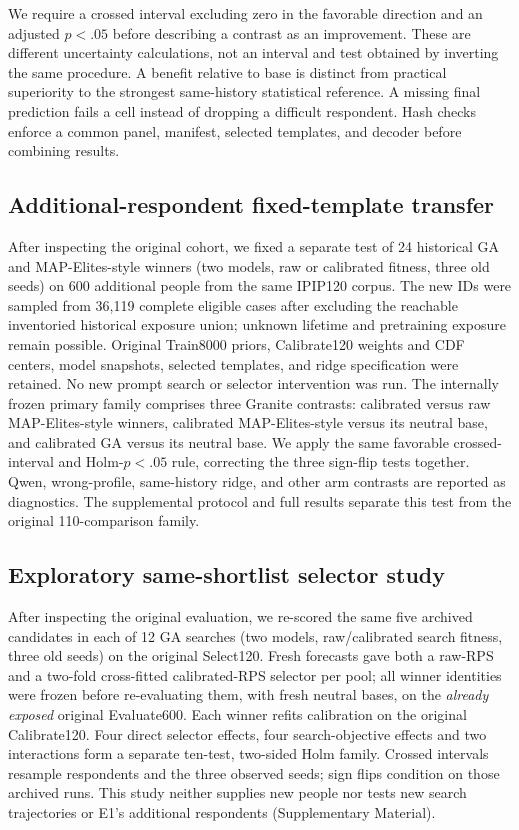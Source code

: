 \documentclass[sigconf,anonymous]{aamas}
\begin{document}
We require a crossed interval excluding zero in the favorable direction and
an adjusted $p<.05$ before describing a contrast as an improvement. These are
different uncertainty calculations, not an interval and test obtained by
inverting the same procedure. A benefit relative to base is distinct from
practical superiority to the strongest same-history statistical reference.
A missing final prediction fails a cell instead of dropping a difficult
respondent. Hash checks enforce a common panel, manifest, selected templates,
and decoder before combining results.

\subsection{Additional-respondent fixed-template transfer}
After inspecting the original cohort, we fixed a separate test of 24 historical
GA and MAP-Elites-style winners (two models, raw or calibrated fitness, three
old seeds) on 600 additional people from the same IPIP120 corpus. The new IDs
were sampled from 36,119 complete eligible cases after excluding the reachable
inventoried historical exposure union; unknown lifetime and pretraining
exposure remain possible. Original Train8000 priors, Calibrate120 weights and
CDF centers, model snapshots, selected templates, and ridge specification
were retained. No new prompt search or selector intervention was run. The
internally frozen primary family comprises three Granite contrasts:
calibrated versus raw MAP-Elites-style winners, calibrated MAP-Elites-style
versus its neutral base, and calibrated GA versus its neutral base. We apply
the same favorable crossed-interval and Holm-$p<.05$ rule, correcting the
three sign-flip tests together. Qwen, wrong-profile, same-history ridge, and
other arm contrasts are reported as diagnostics. The supplemental protocol
and full results separate this test from the original 110-comparison family.

\subsection{Exploratory same-shortlist selector study}
After inspecting the original evaluation, we re-scored the same five archived
candidates in each of 12 GA searches (two models, raw/calibrated search
fitness, three old seeds) on the original Select120. Fresh forecasts gave
both a raw-RPS and a two-fold cross-fitted calibrated-RPS selector per pool;
all winner identities were frozen before re-evaluating them, with fresh
neutral bases, on the \emph{already exposed} original Evaluate600. Each
winner refits calibration on the original Calibrate120. Four direct selector
effects, four search-objective effects and two interactions form a separate
ten-test, two-sided Holm family. Crossed intervals resample respondents and
the three observed seeds; sign flips condition on those archived runs. This
study neither supplies new people nor tests new search trajectories or E1's
additional respondents (Supplementary Material).
\end{document}

